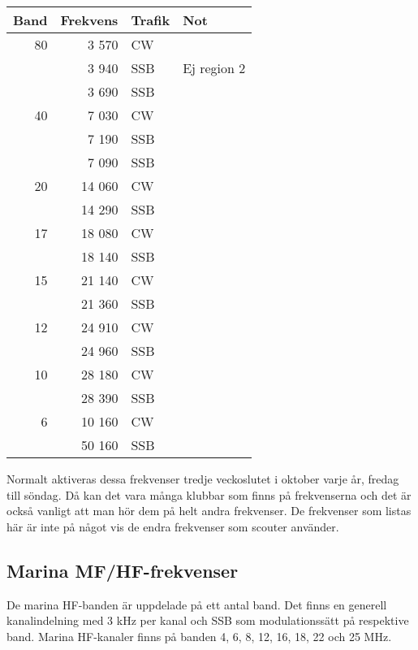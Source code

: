 \begin{tabular}{rrll}
	\textbf{Band} & \textbf{Frekvens} & \textbf{Trafik} & \textbf{Not} \\ \hline

                   80 & 3 570  & CW  &             \\
	              & 3 940  & SSB & Ej region 2 \\
	              & 3 690  & SSB &             \\ \hline
	           40 & 7 030  & CW  &             \\
	              & 7 190  & SSB &             \\
	              & 7 090  & SSB &             \\ \hline
	           20 & 14 060 & CW  &             \\
	              & 14 290 & SSB &             \\ \hline
	           17 & 18 080 & CW  &             \\
	              & 18 140 & SSB &             \\ \hline
	           15 & 21 140 & CW  &             \\
	              & 21 360 & SSB &             \\ \hline
	           12 & 24 910 & CW  &             \\
	              & 24 960 & SSB &             \\ \hline
	           10 & 28 180 & CW  &             \\
	              & 28 390 & SSB &             \\ \hline
	            6 & 10 160 & CW  &             \\
	              & 50 160 & SSB &             \\ \hline
\end{tabular}

Normalt aktiveras dessa frekvenser tredje veckoslutet i oktober varje år, fredag till söndag. Då kan det vara många klubbar som finns på frekvenserna och det är också vanligt att man hör dem på helt andra frekvenser. De frekvenser som listas här är inte på något vis de endra frekvenser som scouter använder.

\subsection{Marina MF/HF-frekvenser}

De marina HF-banden är uppdelade på ett antal band. Det finns en generell kanalindelning med 3 kHz per kanal och SSB som modulationssätt på respektive band. Marina HF-kanaler finns på banden 4, 6, 8, 12, 16, 18, 22 och 25 MHz. 

